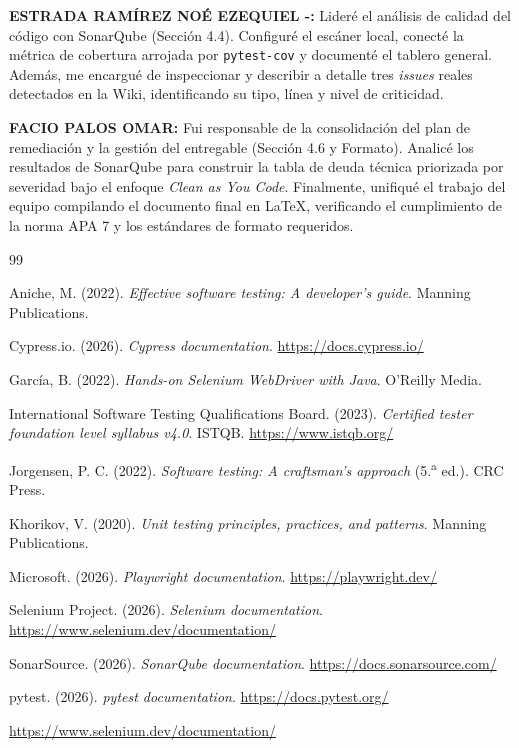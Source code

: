 \documentclass[12pt]{article}
\begin{document}
\textbf{ESTRADA RAMÍREZ NOÉ EZEQUIEL -:} Lideré el análisis de calidad del código con SonarQube (Sección 4.4). Configuré el escáner local, conecté la métrica de cobertura arrojada por \texttt{pytest-cov} y documenté el tablero general. Además, me encargué de inspeccionar y describir a detalle tres \textit{issues} reales detectados en la Wiki, identificando su tipo, línea y nivel de criticidad.

\textbf{FACIO PALOS OMAR:} Fui responsable de la consolidación del plan de remediación y la gestión del entregable (Sección 4.6 y Formato). Analicé los resultados de SonarQube para construir la tabla de deuda técnica priorizada por severidad bajo el enfoque \textit{Clean as You Code}. Finalmente, unifiqué el trabajo del equipo compilando el documento final en \LaTeX{}, verificando el cumplimiento de la norma APA 7 y los estándares de formato requeridos.
\newpage
\begin{thebibliography}{99}
\setlength{\itemsep}{0.4em}

Aniche, M. (2022). \textit{Effective software testing: A developer's guide}. Manning Publications.

Cypress.io. (2026). \textit{Cypress documentation}. \url{https://docs.cypress.io/}

García, B. (2022). \textit{Hands-on Selenium WebDriver with Java}. O'Reilly Media.

International Software Testing Qualifications Board. (2023). \textit{Certified tester foundation level syllabus v4.0}. ISTQB. \url{https://www.istqb.org/}

Jorgensen, P. C. (2022). \textit{Software testing: A craftsman's approach} (5.\textsuperscript{a} ed.). CRC Press.

Khorikov, V. (2020). \textit{Unit testing principles, practices, and patterns}. Manning Publications.

Microsoft. (2026). \textit{Playwright documentation}. \url{https://playwright.dev/}

Selenium Project. (2026). \textit{Selenium documentation}. \url{https://www.selenium.dev/documentation/}

SonarSource. (2026). \textit{SonarQube documentation}. \url{https://docs.sonarsource.com/}

pytest. (2026). \textit{pytest documentation}. \url{https://docs.pytest.org/}

\url{https://www.selenium.dev/documentation/}

\end{thebibliography}
\end{document}
